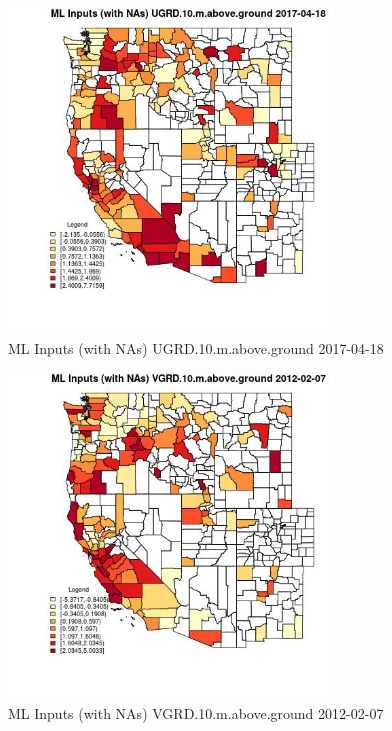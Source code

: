 \begin{figure} 
\centering  
\includegraphics[width=0.77\textwidth]{Code_Outputs/Report_ML_input_PM25_Step4_part_f_de_duplicated_aveswNAs_CountyUGRD10mabovegroundMean2017-04-18.jpg} 
\caption{\label{fig:Report_ML_input_PM25_Step4_part_f_de_duplicated_aveswNAsCountyUGRD10mabovegroundMean2017-04-18}ML Inputs (with NAs) UGRD.10.m.above.ground 2017-04-18} 
\end{figure} 
 

\clearpage 

\begin{figure} 
\centering  
\includegraphics[width=0.77\textwidth]{Code_Outputs/Report_ML_input_PM25_Step4_part_f_de_duplicated_aveswNAs_CountyVGRD10mabovegroundMean2012-02-07.jpg} 
\caption{\label{fig:Report_ML_input_PM25_Step4_part_f_de_duplicated_aveswNAsCountyVGRD10mabovegroundMean2012-02-07}ML Inputs (with NAs) VGRD.10.m.above.ground 2012-02-07} 
\end{figure} 
 

